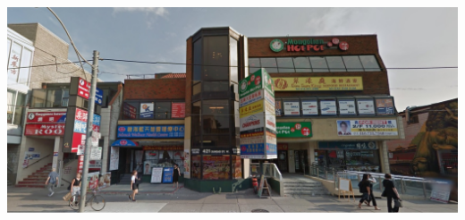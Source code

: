 \documentclass[titlepage,oneside,openany,10pt]{book}
\begin{document}
\begin{center}
	\includegraphics[scale = 0.5]{Other_Figures/Outside View of Dim Sum King.jpg}
\end{center}

\end{document}
